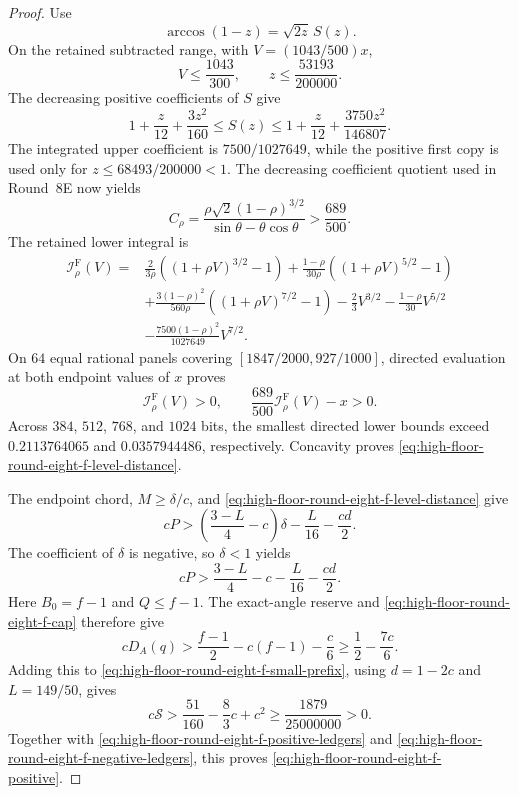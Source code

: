 \documentclass[11pt]{article}
\theoremstyle{remark}
\begin{document}
\begin{proof}
Use
\[
 \arccos(1-z)=\sqrt{2z}\,S(z).
\]
On the retained subtracted range, with $V=(1043/500)x$,
\[
 V\leq\frac{1043}{300},\qquad
 z\leq\frac{53193}{200000}.
\]
The decreasing positive coefficients of $S$ give
\begin{equation}
 1+\frac z{12}+\frac{3z^2}{160}
 \leq S(z)\leq
 1+\frac z{12}+\frac{3750z^2}{146807}.
 \label{eq:high-floor-round-eight-f-series}
\end{equation}
The integrated upper coefficient is $7500/1027649$, while the positive
first copy is used only for $z\leq68493/200000<1$.  The decreasing
coefficient quotient used in Round~8E now yields
\begin{equation}
 C_\rho=
 \frac{\rho\sqrt2(1-\rho)^{3/2}}
 {\sin\theta-\theta\cos\theta}>\frac{689}{500}.
 \label{eq:high-floor-round-eight-f-coefficient}
\end{equation}
The retained lower integral is
\begin{equation}
\begin{aligned}
 \mathcal I^{\mathrm F}_\rho(V)
={}&\frac{2}{3\rho}
 \left((1+\rho V)^{3/2}-1\right)
 +\frac{1-\rho}{30\rho}
 \left((1+\rho V)^{5/2}-1\right)\\
&+\frac{3(1-\rho)^2}{560\rho}
 \left((1+\rho V)^{7/2}-1\right)
 -\frac23V^{3/2}-\frac{1-\rho}{30}V^{5/2}\\
&-\frac{7500(1-\rho)^2}{1027649}V^{7/2}.
\end{aligned}
 \label{eq:high-floor-round-eight-f-integral}
\end{equation}
On $64$ equal rational panels covering
$[1847/2000,927/1000]$, directed evaluation at both endpoint values of
$x$ proves
\begin{equation}
 \mathcal I^{\mathrm F}_\rho(V)>0,\qquad
 \frac{689}{500}\mathcal I^{\mathrm F}_\rho(V)-x>0.
 \label{eq:high-floor-round-eight-f-panels}
\end{equation}
Across $384$, $512$, $768$, and $1024$ bits, the smallest directed lower
bounds exceed $0.2113764065$ and $0.0357944486$, respectively.
Concavity proves \eqref{eq:high-floor-round-eight-f-level-distance}.

The endpoint chord, $M\geq\delta/c$, and
\eqref{eq:high-floor-round-eight-f-level-distance} give
\[
 cP>\left(\frac{3-L}{4}-c\right)\delta
      -\frac L{16}-\frac{cd}{2}.
\]
The coefficient of $\delta$ is negative, so $\delta<1$ yields
\begin{equation}
 cP>\frac{3-L}{4}-c-\frac L{16}-\frac{cd}{2}.
 \label{eq:high-floor-round-eight-f-small-prefix}
\end{equation}
Here $B_0=f-1$ and $Q\leq f-1$.  The exact-angle reserve and
\eqref{eq:high-floor-round-eight-f-cap} therefore give
\[
 cD_A(q)>\frac{f-1}{2}-c(f-1)-\frac c6
 \geq\frac12-\frac{7c}{6}.
\]
Adding this to \eqref{eq:high-floor-round-eight-f-small-prefix}, using
$d=1-2c$ and $L=149/50$, gives
\begin{equation}
 c\mathcal S>
 \frac{51}{160}-\frac83c+c^2
 \geq\frac{1879}{25000000}>0.
 \label{eq:high-floor-round-eight-f-small-delta}
\end{equation}
Together with \eqref{eq:high-floor-round-eight-f-positive-ledgers} and
\eqref{eq:high-floor-round-eight-f-negative-ledgers}, this proves
\eqref{eq:high-floor-round-eight-f-positive}.


\end{proof}
\end{document}
